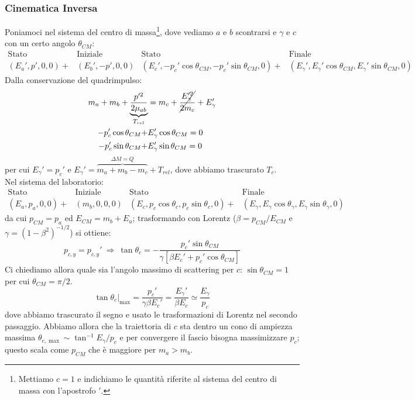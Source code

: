 \subsubsection{Cinematica Inversa} 
Poniamoci nel sistema del centro di massa\footnote{Mettiamo $c=1$ e indichiamo le quantità riferite al sistema del centro di massa con l'apostrofo $'$.}, dove vediamo $a$ e $b$ scontrarsi e $\gamma$ e $c$  con un certo angolo $\theta_{CM}$:
\begin{align*}
	\text{Stato  }&\text{Iniziale} & \text{Stato  }&\text{Finale} \\
	(E_a',p',0,0) +&(E_b',-p',0,0) & (E_c',-p_c'\cos{\theta_{CM}},-p_c'\sin{\theta_{CM},0}) +&(E_\gamma',E_\gamma'\cos{\theta_{CM}},E_\gamma'\sin{\theta_{CM}},0) 
\end{align*}
Dalla conservazione del quadrimpulso:
\begin{align*}
	m_a+m_b + \underbrace{\frac{p'^{2}}{2\mu_{ab}}}_{T_{rel}} &= m_c + \cancel{\frac{E_\gamma'^2}{2m_c}}+E_\gamma' \\ 
	-p_c'\cos{\theta_{CM}} +& E_\gamma' \cos{\theta_{CM}} = 0\\
	-p_c'\sin{\theta_{CM}} +& E_\gamma' \sin{\theta_{CM}} = 0
\end{align*}
per cui $E_\gamma' = p_c'$ e $E_\gamma' = \overbrace{m_a+m_b-m_c}^{\Delta M = Q} + T_{rel}$, dove abbiamo trascurato $T_c$.\\ 
Nel sistema del laboratorio:
\begin{align*}
	\text{Stato  }&\text{Iniziale} & \text{Stato  }&\text{Finale} \\
	(E_a,p_a,0,0) +&(m_b,0,0,0) & (E_c,p_c\cos{\theta_{c}},p_c\sin{\theta_{c},0}) +&(E_\gamma,E_\gamma\cos{\theta_{\gamma}},E_\gamma\sin{\theta_{\gamma}},0) 
\end{align*}
da cui $p_{CM} =p_a$ ed $E_{CM} = m_b + E_a$; trasformando con Lorentz ($\beta = p_{CM}/E_{CM}$ e $\gamma = (1-\beta^2)^{-1/2}$) si ottiene:
$$p_{c,y} = p_{c,y}' \:\Rightarrow\: \tan{\theta_c} = -\frac{p_c' \sin{\theta_{CM}}}{\gamma [\beta E_c' +p_c'\cos{\theta_{CM}}]}$$
Ci chiediamo allora quale sia l'angolo massimo di scattering per $c$: $\sin{\theta_{CM}}=1$ per cui $\theta_{CM} = \pi/2$.
$$\tan{\theta_c}|_{\max{}} = \frac{p_c'}{\gamma\beta E_c'} = \frac{E_\gamma'}{\beta E_c}\simeq \frac{E_\gamma}{p_c} $$
dove abbiamo trascurato il segno e usato le trasformazioni di Lorentz nel secondo passaggio. Abbiamo allora che la traiettoria di $c$ sta dentro un cono di ampiezza massima $\theta_{c,\max{}} \sim \tan^{-1}{E_\gamma/p_c}$ e per convergere il fascio bisogna massimizzare $p_c$; questo scala come $p_{CM}$ che è maggiore per $m_a>m_b$.\\
